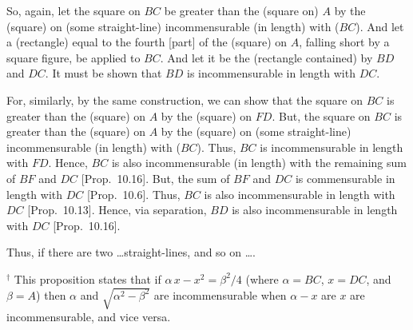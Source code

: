 \begin{Parallel}{}{}
{So, again, let the square on $BC$ be greater than the (square on) $A$ by
the (square) on (some straight-line) incommensurable (in length) with ($BC$). And let a (rectangle) equal to the fourth [part] of the (square) on  $A$, falling short by a
square figure, be applied to $BC$.  And let it be the (rectangle contained) by $BD$ and $DC$. It must be shown that $BD$ is incommensurable in length with $DC$.

For, similarly, by the same construction, we can show that the square on $BC$ is greater than the (square) on $A$ by the (square) on $FD$. But,
the square on $BC$ is greater than the (square) on $A$ by the (square) on (some straight-line)
incommensurable (in length) with ($BC$). Thus, $BC$ is incommensurable in length with
$FD$. Hence, $BC$ is also incommensurable (in length) with the remaining sum of $BF$ and
$DC$ [Prop.~10.16]. But, the sum of
$BF$ and $DC$ is commensurable in length with $DC$ [Prop.~10.6]. Thus, $BC$ is also incommensurable
in length with $DC$ [Prop.~10.13]. Hence, via
separation, $BD$ is
also incommensurable in length with $DC$ [Prop.~10.16].

Thus,  if there are two \ldots straight-lines, and so on \ldots.}
\end{Parallel}
{\footnotesize\noindent$^\dag$ This proposition states that if $\alpha\,x-x^2=\beta^2/4$ (where $\alpha=BC$, $x=DC$,
and $\beta=A$) then $\alpha$ and $\sqrt{\alpha^2-\beta^2}$ are incommensurable when $\alpha-x$ are $x$ are incommensurable, and {\rm vice versa}.}

